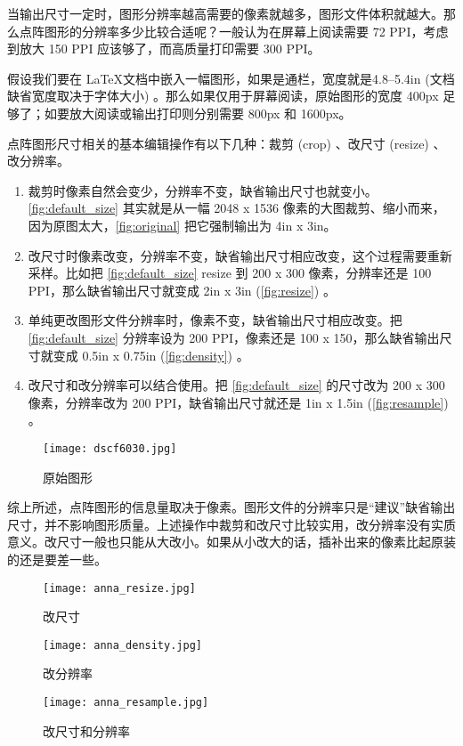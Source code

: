 当输出尺寸一定时，图形分辨率越高需要的像素就越多，图形文件体积就越大。那么点阵图形的分辨率多少比较合适呢？一般认为在屏幕上阅读需要 72 PPI，考虑到放大 150 PPI 应该够了，而高质量打印需要 300 PPI。

假设我们要在 \LaTeX 文档中嵌入一幅图形，如果是通栏，宽度就是4.8--5.4in (文档缺省宽度取决于字体大小) 。那么如果仅用于屏幕阅读，原始图形的宽度 400px 足够了；如要放大阅读或输出打印则分别需要 800px 和 1600px。

点阵图形尺寸相关的基本编辑操作有以下几种：裁剪 (crop) 、改尺寸 (resize) 、改分辨率。

\begin{enumerate}
\item 裁剪时像素自然会变少，分辨率不变，缺省输出尺寸也就变小。\autoref{fig:default_size} 其实就是从一幅 2048 x 1536 像素的大图裁剪、缩小而来，因为原图太大，\autoref{fig:original} 把它强制输出为 4in x 3in。

\item 改尺寸时像素改变，分辨率不变，缺省输出尺寸相应改变，这个过程需要重新采样。比如把 \autoref{fig:default_size} resize 到 200 x 300 像素，分辨率还是 100 PPI，那么缺省输出尺寸就变成 2in x 3in (\autoref{fig:resize}) 。

\item 单纯更改图形文件分辨率时，像素不变，缺省输出尺寸相应改变。把 \autoref{fig:default_size} 分辨率设为 200 PPI，像素还是 100 x 150，那么缺省输出尺寸就变成 0.5in x 0.75in (\autoref{fig:density}) 。

\item 改尺寸和改分辨率可以结合使用。把 \autoref{fig:default_size} 的尺寸改为 200 x 300 像素，分辨率改为 200 PPI，缺省输出尺寸就还是 1in x 1.5in (\autoref{fig:resample}) 。
\end{enumerate}

\begin{figure}[htbp]
\centering
\texttt{[image: dscf6030.jpg]}
\caption{原始图形}
\label{fig:original}
\end{figure}

综上所述，点阵图形的信息量取决于像素。图形文件的分辨率只是“建议”缺省输出尺寸，并不影响图形质量。上述操作中裁剪和改尺寸比较实用，改分辨率没有实质意义。改尺寸一般也只能从大改小。如果从小改大的话，插补出来的像素比起原装的还是要差一些。

\begin{figure}[htbp]
\centering
\begin{minipage}[b]{2in}
\centering
\texttt{[image: anna\_resize.jpg]}
\caption{改尺寸}
\label{fig:resize}
\end{minipage}
\begin{minipage}[b]{1.1in}
\centering
\texttt{[image: anna\_density.jpg]}
\caption{改分辨率}
\label{fig:density}
\end{minipage}
\begin{minipage}[b]{1.6in}
\centering
\texttt{[image: anna\_resample.jpg]}
\caption{改尺寸和分辨率}
\label{fig:resample}
\end{minipage}
\end{figure}

